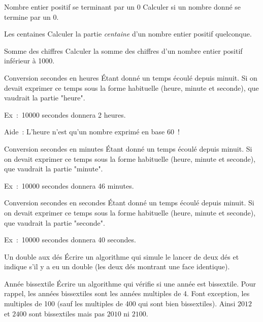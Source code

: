 			\begin{Exercice}{Nombre entier positif se terminant par un 0}
				Calculer si un nombre donné se termine par un 0.
			\end{Exercice}
	
			\begin{Exercice}{Les centaines}
				Calculer la partie \emph{centaine}
				d’un nombre entier positif quelconque.
			\end{Exercice}
	
			\begin{Exercice}{Somme des chiffres}
				Calculer la somme des chiffres
				d’un nombre entier positif inférieur à 1000.
			\end{Exercice}
		
			\begin{Exercice}{Conversion secondes en heures}
				Étant donné un temps écoulé depuis minuit.
				Si on devait exprimer ce temps sous la forme
				habituelle (heure, minute et seconde),
				que vaudrait la partie "heure".
		
				Ex~:~10000 secondes donnera 2 heures.
				
				Aide~: L’heure n’est qu’un nombre exprimé en base 60~!
			\end{Exercice}
		
			\begin{Exercice}{Conversion secondes en minutes}
				Étant donné un temps écoulé depuis minuit.
				Si on devait exprimer ce temps sous la forme
				habituelle (heure, minute et seconde),
				que vaudrait la partie "minute".
		
				Ex~:~10000 secondes donnera 46 minutes.
			\end{Exercice}
		
			\begin{Exercice}{Conversion secondes en secondes}
				Étant donné un temps écoulé depuis minuit.
				Si on devait exprimer ce temps sous la forme
				habituelle (heure, minute et seconde),
				que vaudrait la partie "seconde".
		
				Ex~:~10000 secondes donnera 40 secondes.
			\end{Exercice}	

			\begin{Exercice}{Un double aux dés}
				Écrire un algorithme qui simule le lancer de deux dés
				et indique s’il y a eu un double 
				(les deux dés montrant une face identique).
			\end{Exercice}
		
			\begin{Exercice}{Année bissextile}
				\label{ex:bissextile}
				Écrire un algorithme qui vérifie si une année est bissextile. 
				Pour rappel, les années bissextiles sont les années multiples de 4. 
				Font exception, les multiples de 100 
				(sauf les multiples de 400 qui sont bien bissextiles). 
				Ainsi $2012$ et $2400$ sont bissextiles mais pas $2010$ ni $2100$.
			\end{Exercice}
			 		 


